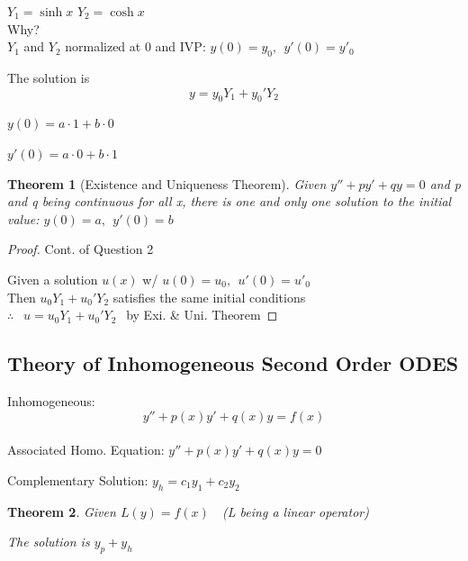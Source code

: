 \documentclass[12pt]{article}
\numberwithin{equation}{subsection}
\newtheorem{theorem}{Theorem}[section]
\newcommand{\indb}{\hspace{1cm}}
\newcommand{\indn}{\hspace{7cm}}
\newcommand{\inds}{\hspace{9.5cm}}
\begin{document}
\indn $Y_1=\sinh x$ \hspace{3cm} $Y_2= \cosh x$\\


Why?\\

\indb $Y_1$ and $Y_2$ normalized at 0 and IVP: $y(0)=y_0,\ \ y'(0)=y'_0$

The solution is 
\begin{equation}
y=y_0Y_1+y_0'Y_2
\end{equation}

\inds $y(0)=a \cdot 1 + b \cdot 0$

\inds $y'(0)=a \cdot 0 + b \cdot 1$\\


\begin{theorem}[Existence and Uniqueness Theorem]
Given $y''+py'+qy=0$ and p and q being continuous for all x, there is one and only one solution to the initial value: $y(0)=a,\ \ y'(0)=b$
\end{theorem}

\newpage

\begin{proof}
Cont. of Question 2

Given a solution $u(x)$ w/ $u(0)=u_0,\ \ u'(0)=u'_0$\\

Then $u_0Y_1+u_0'Y_2$ satisfies the same initial conditions\\

$\therefore\ \ $ $u=u_0Y_1+u_0'Y_2\ \ $ by Exi. \& Uni. Theorem \end{proof}

\newpage
\subsection{Theory of Inhomogeneous Second Order ODES}

Inhomogeneous:
\begin{equation}
y''+p(x)y'+q(x)y= f(x)
\end{equation}\\

Associated Homo. Equation: $y''+p(x)y'+q(x)y= 0$

Complementary Solution: $y_h=c_1y_1+c_2y_2$

\begin{theorem}
Given $L(y)=f(x)\ \ \ $ (L being a linear operator)

The solution is $y_p + y_h$
\end{theorem}
\end{document}
